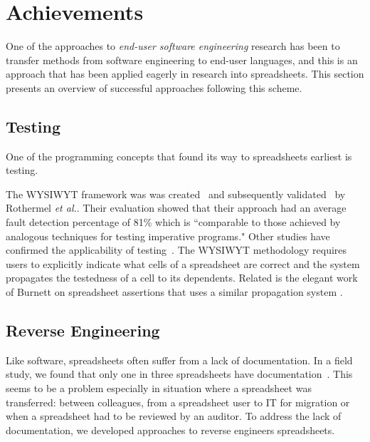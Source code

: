 \documentclass[conference]{IEEEtran}
\begin{document}
\section{Achievements} 
One of the approaches to \emph{end-user software engineering} research has been to transfer methods from software engineering to end-user languages, and this is an approach that has been applied eagerly in research into spreadsheets.  This section presents an overview of successful approaches following this scheme.

\subsection{Testing}
One of the programming concepts that found its way to spreadsheets earliest is testing. 


The WYSIWYT framework was was created~\cite{Rothermel1997} and subsequently validated~\cite{Rothermel2000} by Rothermel \emph{et al.}. Their evaluation showed that their approach had an average fault detection percentage of 81\% which is ``comparable  to  those  achieved  by  analogous  techniques  for testing  imperative  programs." Other studies have confirmed the applicability of testing~\cite{Kruck2006}. The WYSIWYT methodology requires users to explicitly indicate what cells of a spreadsheet are correct and the system propagates the testedness of a cell to its dependents. Related is the elegant work of Burnett on spreadsheet assertions that uses a similar propagation system \cite{Burnett2003}.

\subsection{Reverse Engineering} 
Like software, spreadsheets often suffer from a lack of documentation. In a field study, we found that only one in three spreadsheets have documentation~\cite{hermans_supporting_2011}. This seems to be a problem especially in situation where a spreadsheet was transferred: between colleagues, from a spreadsheet user to IT for migration or when a spreadsheet had to be reviewed by an auditor. To address the lack of documentation, we developed approaches to reverse engineers spreadsheets.
\end{document}
